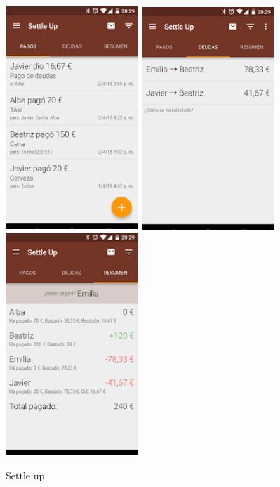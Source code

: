 \begin{itemize}
\begin{itemize}
\begin{figure}[!h]
\centering
\includegraphics[scale=0.90]{Figures/settleUp1.jpg}
\includegraphics[scale=0.90]{Figures/settleUp2.jpg}
\includegraphics[scale=0.90]{Figures/settleUp3.jpg}
\caption{Settle up}
\end{figure}


\end{itemize}
\end{itemize}
